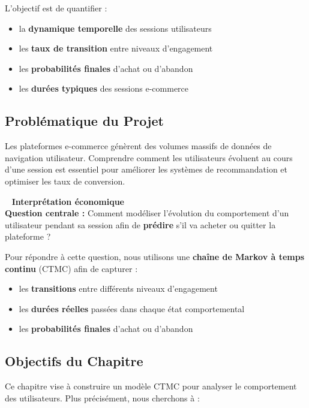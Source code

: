 \documentclass[11pt,a4paper]{article}
\newenvironment{insightbox}{%
  \vspace{3pt}\begin{framed}
  \noindent{\color{NavyBlue}\rule{0.3cm}{3pt}}~%
  \textcolor{NavyBlue}{\textbf{Interprétation économique}}\\[3pt]}
  {\end{framed}\vspace{3pt}}
\begin{document}
L'objectif est de quantifier :

\begin{itemize}[leftmargin=2cm,itemsep=2pt]
  \item la \textbf{dynamique temporelle} des sessions utilisateurs
  \item les \textbf{taux de transition} entre niveaux d'engagement
  \item les \textbf{probabilités finales} d'achat ou d'abandon
  \item les \textbf{durées typiques} des sessions e-commerce
\end{itemize}

\subsection{Problématique du Projet}

Les plateformes e-commerce génèrent des volumes massifs de données de navigation utilisateur.
Comprendre comment les utilisateurs évoluent au cours d'une session est essentiel pour
améliorer les systèmes de recommandation et optimiser les taux de conversion.

\begin{insightbox}
\textbf{Question centrale :} Comment modéliser l'évolution du comportement d'un utilisateur
pendant sa session afin de \textbf{prédire} s'il va acheter ou quitter la plateforme ?
\end{insightbox}

Pour répondre à cette question, nous utilisons une \textbf{chaîne de Markov à temps continu}
(CTMC) afin de capturer :

\begin{itemize}[leftmargin=2cm,itemsep=2pt]
  \item les \textbf{transitions} entre différents niveaux d'engagement
  \item les \textbf{durées réelles} passées dans chaque état comportemental
  \item les \textbf{probabilités finales} d'achat ou d'abandon
\end{itemize}

\subsection{Objectifs du Chapitre}

Ce chapitre vise à construire un modèle CTMC pour analyser le comportement des utilisateurs.
Plus précisément, nous cherchons à :
\end{document}

